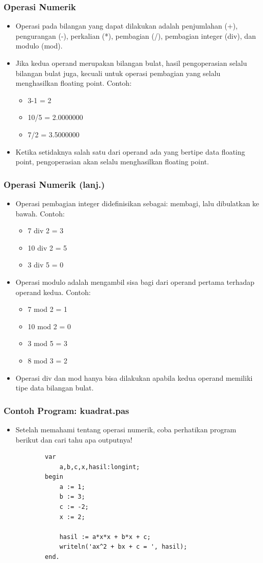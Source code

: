 \documentclass{beamer}
\begin{document}
\begin{frame}
\frametitle{Operasi Numerik}
\begin{itemize}
	\item Operasi pada bilangan yang dapat dilakukan adalah penjumlahan (+), pengurangan (-), perkalian (*), pembagian (/), pembagian integer (div), dan modulo (mod).
	\item Jika kedua operand merupakan bilangan bulat, hasil pengoperasian selalu bilangan bulat juga, kecuali untuk operasi pembagian yang selalu menghasilkan floating point. Contoh:
	\begin{itemize}
		\item 3-1 = 2
		\item 10/5 = 2.0000000
		\item 7/2 = 3.5000000
	\end{itemize}
	\item Ketika setidaknya salah satu dari operand ada yang bertipe data floating point, pengoperasian akan selalu menghasilkan floating point.
\end{itemize}
\end{frame}

\begin{frame}
\frametitle{Operasi Numerik (lanj.)}
\begin{itemize}
	\item Operasi pembagian integer didefinisikan sebagai: membagi, lalu dibulatkan ke bawah. Contoh:
	\begin{itemize}
		\item 7 div 2 = 3
		\item 10 div 2 = 5
		\item 3 div 5 = 0
	\end{itemize}
	\item Operasi modulo adalah mengambil sisa bagi dari operand pertama terhadap operand kedua. Contoh:
	\begin{itemize}
		\item 7 mod 2 = 1
		\item 10 mod 2 = 0
		\item 3 mod 5 = 3
		\item 8 mod 3 = 2
	\end{itemize}
	\item Operasi div dan mod hanya bisa dilakukan apabila kedua operand memiliki tipe data bilangan bulat.
\end{itemize}
\end{frame}

\begin{frame}[fragile]
\frametitle{Contoh Program: kuadrat.pas}
\begin{itemize}
	\item Setelah memahami tentang operasi numerik, coba perhatikan program berikut dan cari tahu apa outputnya!
	\begin{lstlisting}
		var
		    a,b,c,x,hasil:longint;
		begin
		    a := 1;
		    b := 3;
		    c := -2;
		    x := 2;	    

		    hasil := a*x*x + b*x + c;
		    writeln('ax^2 + bx + c = ', hasil);
		end.
	\end{lstlisting}
\end{itemize}
\end{frame}
\end{document}
